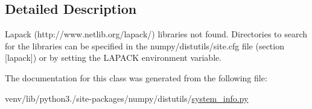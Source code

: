 \subsection{Detailed Description}
\begin{DoxyVerb}Lapack (http://www.netlib.org/lapack/) libraries not found.
Directories to search for the libraries can be specified in the
numpy/distutils/site.cfg file (section [lapack]) or by setting
the LAPACK environment variable.\end{DoxyVerb}
 

The documentation for this class was generated from the following file\+:\begin{DoxyCompactItemize}
\item 
venv/lib/python3./site-\/packages/numpy/distutils/\hyperlink{system__info_8py}{system\+\_\+info.\+py}\end{DoxyCompactItemize}
